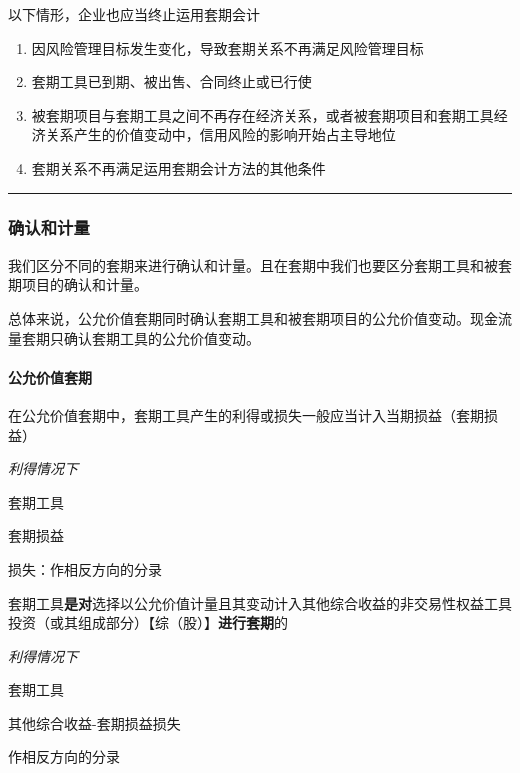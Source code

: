 \documentclass[UTF8,12pt]{ctexart}
\newenvironment{Dr}{%
	\begin{list}{}%
		{
			\setlength{\leftmargin}{2em}
			\setlength{\labelwidth}{2em}
			\setlength{\labelsep}{0pt}
			\setlength{\itemindent}{0pt}
			\setlength{\listparindent}{0pt}
			\setlength{\parsep}{0pt}
			\setlength{\topsep}{0pt}
		}
		\item[\textbf{借：}]
	}{%
	\end{list}
}
\newenvironment{Cr}{%
	\begin{list}{}%
		{
			\setlength{\leftmargin}{3em}
			\setlength{\labelwidth}{2em}
			\setlength{\labelsep}{0pt}
			\setlength{\itemindent}{0pt}
			\setlength{\listparindent}{0pt}
			\setlength{\parsep}{0pt}
			\setlength{\topsep}{0pt}
		}
		\item[\textbf{贷：}]
	}{%
	\end{list}
}
\numberwithin{equation}{section} %
\numberwithin{figure}{section}
\numberwithin{table}{section}
\begin{document}
	以下情形，企业也应当终止运用套期会计
	\begin{enumerate}
		\item 因风险管理目标发生变化，导致套期关系不再满足风险管理目标
		
		\item 套期工具已到期、被出售、合同终止或已行使
		
		\item 被套期项目与套期工具之间不再存在经济关系，或者被套期项目和套期工具经济关系产生的价值变动中，信用风险的影响开始占主导地位
		
		\item 套期关系不再满足运用套期会计方法的其他条件
	\end{enumerate}
	
	\vspace{5pt}
	\hrule
	\vspace{5pt}
	
	\subsubsection{确认和计量}
	我们区分不同的套期来进行确认和计量。且在套期中我们也要区分套期工具和被套期项目的确认和计量。
	
	总体来说，公允价值套期同时确认套期工具和被套期项目的公允价值变动。现金流量套期只确认套期工具的公允价值变动。
	
	\paragraph{公允价值套期}
	
	在公允价值套期中，套期工具产生的利得或损失一般应当计入当期损益（套期损益）

	\textit{利得情况下}
	
	\begin{Dr}
		套期工具
	\end{Dr}
	\begin{Cr}
		套期损益
	\end{Cr}
	损失：作相反方向的分录
	
	套期工具\textbf{是对}选择以公允价值计量且其变动计入其他综合收益的非交易性权益工具投资（或其组成部分）【综（股）】\textbf{进行套期}的
	
	\textit{利得情况下}
	
	\begin{Dr}
		套期工具
	\end{Dr}
	\begin{Cr}
		其他综合收益-套期损益损失
	\end{Cr}
	作相反方向的分录
	
\end{document}
